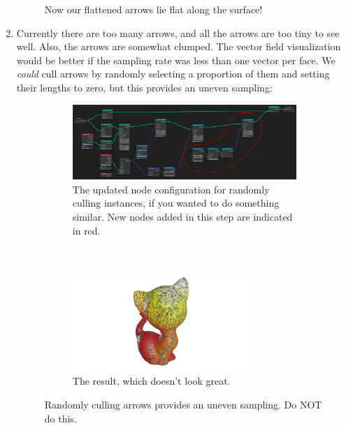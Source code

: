 \documentclass[10pt]{article}
\begin{document}
\begin{enumerate}
\begin{figure}[H]
        \caption{Now our flattened arrows lie flat along the surface!}
        \label{fig:vector_instance_adhering}
    \end{figure}
    \item Currently there are too many arrows, and all the arrows are too tiny to see well. Also, the arrows are somewhat clumped. The vector field visualization would be better if the sampling rate was less than one vector per face. We \emph{could} cull arrows by randomly selecting a proportion of them and setting their lengths to zero, but this provides an uneven sampling:
    \begin{figure}[H]
        \centering
        \captionsetup{width=0.8\textwidth}
        \begin{subfigure}[b]{\textwidth}
         \centering
         \includegraphics[width=\textwidth]{images/vector_instance_random-cull_nodes.png}
         \caption{The updated node configuration for randomly culling instances, if you wanted to do something similar. New nodes added in this step are indicated in red.}
        \end{subfigure} \\
        \begin{subfigure}[b]{\textwidth}
         \centering
         \includegraphics[width=0.8\textwidth]{images/vector_instance_random-cull.png}
         \caption{The result, which doesn't look great.}
        \end{subfigure}
        \caption{Randomly culling arrows provides an uneven sampling. Do NOT do this.}

\end{figure}
\end{enumerate}
\end{document}
